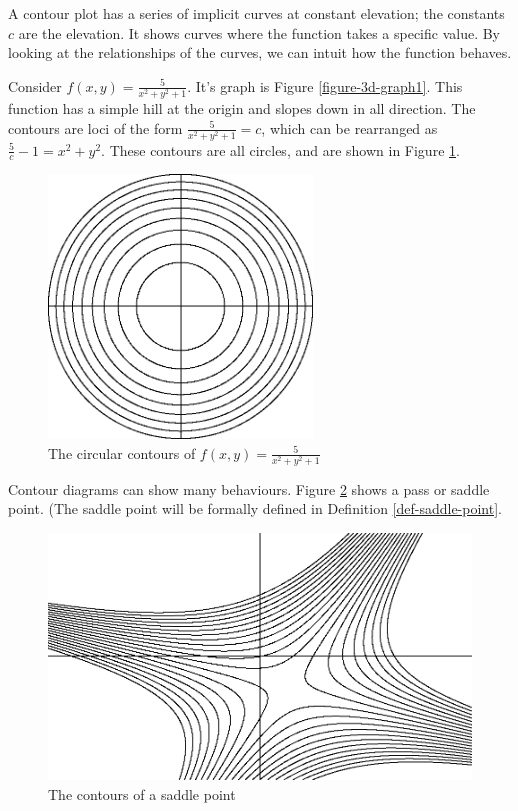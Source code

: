 \documentclass[fleqn,letterpaper]{report}
\begin{document}
A contour plot has a series of implicit curves at constant
elevation; the constants $c$ are the elevation. It shows
curves where the function takes a specific value. By looking
at the relationships of the curves, we can intuit how the
function behaves.

\begin{example}
Consider $f(x,y) = \frac{5}{x^2+y^2+1}$. It's graph is Figure
\ref{figure-3d-graph1}. This function has
a simple hill at the origin and slopes down in all direction.
The contours are loci of the form $\frac{5}{x^2 + y^2 + 1} =
c$, which can be rearranged as $\frac{5}{c} - 1 = x^2 + y^2$.
These contours are all circles, and are shown in Figure
\ref{figure-contour-plot1}.
\end{example}

\begin{figure}[t]
\centering
\includegraphics[width=7cm]{figure32.eps}
\caption{The circular contours of $f(x,y) = \frac{5}{x^2 + y^2
+ 1}$}
\label{figure-contour-plot1}
\end{figure}

\begin{example}
Contour diagrams can show many behaviours. Figure
\ref{figure-contour-plot2} shows a pass or saddle point. (The saddle
point will be formally defined in Definition
\ref{def-saddle-point}. 
\end{example}

\begin{figure}[ht]
\centering
\includegraphics[width=12cm]{figure34.eps}
\caption{The contours of a saddle point}
\label{figure-contour-plot2}
\end{figure}
\end{document}
